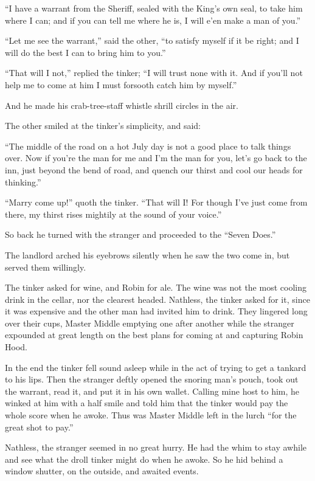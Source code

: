 ``I have a warrant from the Sheriff, sealed with the King's own seal, to
take him where I can; and if you can tell me where he is, I will e'en
make a man of you.''

``Let me see the warrant,'' said the other, ``to satisfy myself if it be
right; and I will do the best I can to bring him to you.''

``That will I not,'' replied the tinker; ``I will trust none with it.
And if you'll not help me to come at him I must forsooth catch him by
myself.''

And he made his crab-tree-staff whistle shrill circles in the air.

The other smiled at the tinker's simplicity, and said:

``The middle of the road on a hot July day is not a good place to talk
things over. Now if you're the man for me and I'm the man for you, let's
go back to the inn, just beyond the bend of road, and quench our thirst
and cool our heads for thinking.''

``Marry come up!'' quoth the tinker. ``That will I! For though I've just
come from there, my thirst rises mightily at the sound of your voice.''

So back he turned with the stranger and proceeded to the ``Seven Does.''

The landlord arched his eyebrows silently when he saw the two come in,
but served them willingly.

The tinker asked for wine, and Robin for ale. The wine was not the most
cooling drink in the cellar, nor the clearest headed. Nathless, the
tinker asked for it, since it was expensive and the other man had
invited him to drink. They lingered long over their cups, Master Middle
emptying one after another while the stranger expounded at great length
on the best plans for coming at and capturing Robin Hood.

In the end the tinker fell sound asleep while in the act of trying to
get a tankard to his lips. Then the stranger deftly opened the snoring
man's pouch, took out the warrant, read it, and put it in his own
wallet. Calling mine host to him, he winked at him with a half smile and
told him that the tinker would pay the whole score when he awoke. Thus
was Master Middle left in the lurch ``for the great shot to pay.''

Nathless, the stranger seemed in no great hurry. He had the whim to stay
awhile and see what the droll tinker might do when he awoke. So he hid
behind a window shutter, on the outside, and awaited events.


